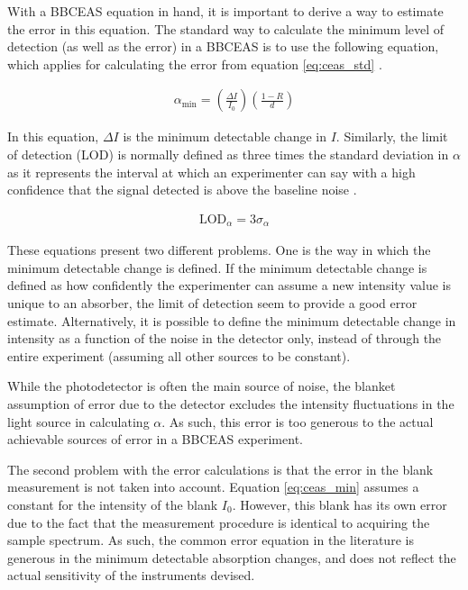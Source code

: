
With a \ac{BBCEAS} equation in hand, it is important to derive a way to
estimate the error in this equation. The standard way to calculate the minimum
level of detection (as well as the error) in a \ac{BBCEAS} is to use the
following equation, which applies for calculating the error from equation
\eqref{eq:ceas_std} \cite{Mazurenka:2005fh}.

\begin{align}
  \alpha_{\text{min}} = \left(\frac{\Delta
  I}{I_0}\right)\left(\frac{1-R}{d}\right)\label{eq:ceas_min}
\end{align}

In this equation, $\Delta I$ is the minimum detectable change in $I$.
Similarly, the limit of detection (LOD) is normally defined as three times
the standard deviation in $\alpha$ as it represents the interval at which an
experimenter can say with a high confidence that the signal detected is above
the baseline noise \cite{Islam:2007ea}.

\begin{align}
  \text{LOD}_{\alpha} = 3\sigma_{\alpha}\label{eq:lod}
\end{align}

These equations present two different problems. One is the way in which the
minimum detectable change is defined. If the minimum detectable change is
defined as how confidently the experimenter can assume a new intensity value
is unique to an absorber, the limit of detection seem to provide a good error
estimate. Alternatively, it is possible to define the minimum detectable
change in intensity as a function of the noise in the detector only, instead
of through the entire experiment (assuming all other sources to be constant).


While the photodetector is often the main source of noise, the blanket
assumption of error due to the detector excludes the intensity fluctuations in
the light source in calculating $\alpha$. As such, this error is too generous
to the actual achievable sources of error in a \ac{BBCEAS} experiment.

The second problem with the error calculations is that the error in the blank
measurement is not taken into account. Equation \eqref{eq:ceas_min} assumes a
constant for the intensity of the blank $I_0$. However, this blank has its own
error due to the fact that the measurement procedure is identical to acquiring
the sample spectrum. As such, the common error equation in the literature is
generous in the minimum detectable absorption changes, and does not reflect
the actual sensitivity of the instruments devised.

